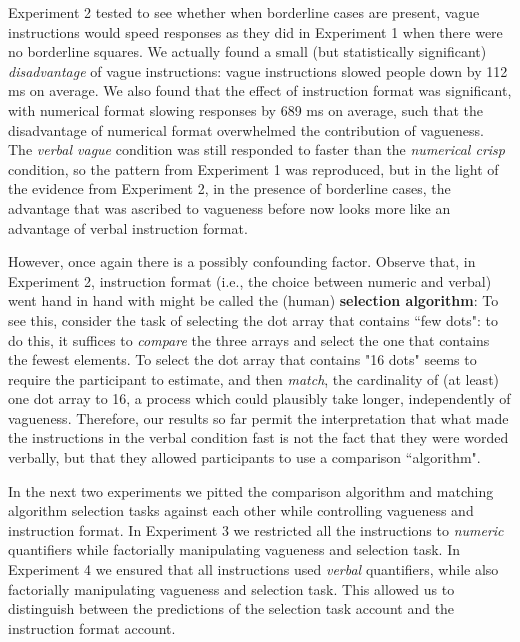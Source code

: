 \documentclass[%
man,		%
floatsintext,%
apacite%
]{apa6} %
\begin{document}
Experiment 2 tested to see whether when borderline cases are present, vague instructions would speed responses as they did in Experiment 1 when there were no borderline squares. 
We actually found a small (but statistically significant) \emph{disadvantage} of vague instructions: vague instructions slowed people down by 112 ms on average. We also found that the effect of instruction format was significant, with numerical format slowing responses by 689 ms on average, such that the disadvantage of numerical format overwhelmed the contribution of vagueness. The \emph{verbal vague} condition was still responded to faster than the \emph{numerical crisp} condition, so the pattern from Experiment 1 was reproduced, but in the light of the evidence from Experiment 2, in the presence of borderline cases, the advantage that was ascribed to vagueness before now looks more like an advantage of verbal instruction format.

However, once again there is a possibly confounding factor. Observe that, in Experiment 2, instruction format (i.e., the choice between numeric and verbal) went hand in hand with might be called the (human) {\bf selection algorithm}: To see this, consider the task of selecting the dot array that contains ``few dots": to do this, it suffices to {\em compare} the three arrays and select the one that contains the fewest elements.  To select the dot array that contains "16 dots" seems to require the participant to estimate, and then {\em match}, the cardinality of (at least) one dot array to 16, a process which could plausibly take longer, independently of vagueness. Therefore, our results so far permit the interpretation that what made the instructions in the verbal condition fast is not the fact that they were worded verbally, but that they allowed participants to use a comparison ``algorithm".

In the next two experiments we pitted the comparison algorithm and matching algorithm selection tasks against each other while controlling vagueness and instruction format. In Experiment 3 we restricted all the instructions to \emph{numeric} quantifiers while factorially manipulating vagueness and selection task. In Experiment 4 we ensured that all instructions used \emph{verbal} quantifiers, while also factorially manipulating vagueness and selection task. This allowed us to distinguish between the predictions of the selection task account and the instruction format account. 

\end{document}
